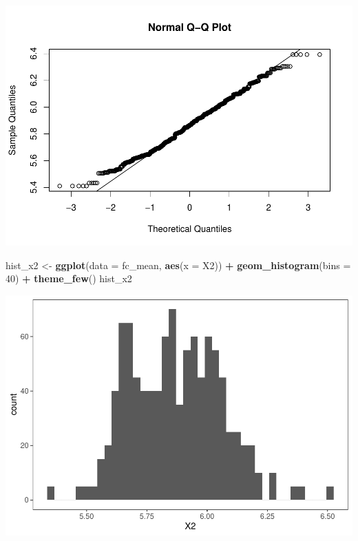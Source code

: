 \documentclass[]{article}
\newenvironment{Shaded}{\begin{snugshade}}{\end{snugshade}}
\newcommand{\DataTypeTok}[1]{\textcolor[rgb]{0.13,0.29,0.53}{#1}}
\newcommand{\DecValTok}[1]{\textcolor[rgb]{0.00,0.00,0.81}{#1}}
\newcommand{\KeywordTok}[1]{\textcolor[rgb]{0.13,0.29,0.53}{\textbf{#1}}}
\newcommand{\NormalTok}[1]{#1}
\newcommand{\OperatorTok}[1]{\textcolor[rgb]{0.81,0.36,0.00}{\textbf{#1}}}
\newcommand{\StringTok}[1]{\textcolor[rgb]{0.31,0.60,0.02}{#1}}
\begin{document}
\includegraphics{Econo2_P4_files/figure-latex/mean ic-2.pdf}

\begin{Shaded}
\begin{Highlighting}[]
\NormalTok{hist_x2 <-}\StringTok{ }\KeywordTok{ggplot}\NormalTok{(}\DataTypeTok{data =}\NormalTok{ fc_mean, }\KeywordTok{aes}\NormalTok{(}\DataTypeTok{x =}\NormalTok{ X2)) }\OperatorTok{+}\StringTok{ }\KeywordTok{geom_histogram}\NormalTok{(}\DataTypeTok{bins =} \DecValTok{40}\NormalTok{) }\OperatorTok{+}\StringTok{ }\KeywordTok{theme_few}\NormalTok{() }
\NormalTok{hist_x2}
\end{Highlighting}
\end{Shaded}

\includegraphics{Econo2_P4_files/figure-latex/mean ic-3.pdf}

\begin{Shaded}
\end{Shaded}
\end{document}
